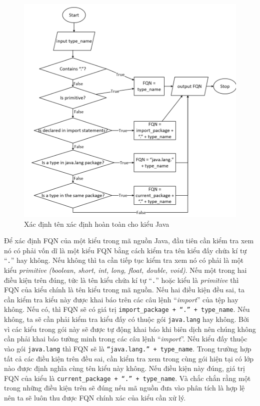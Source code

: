 \documentclass[12pt]{report}
\begin{document}
\begin{figure}[h]
	\centering
	\includegraphics[scale=0.6]{fqn-type}
	\caption{Xác định tên xác định hoàn toàn cho kiểu Java}
	\label{fig:fqn-type}
\end{figure}

Để xác định FQN của một kiểu trong mã nguồn Java, đầu tiên cần kiểm tra xem nó có phải vốn dĩ là một kiểu FQN bằng cách kiểm tra tên kiểu đấy chứa kí tự ``\texttt{.}'' hay không. Nếu không thì ta cần tiếp tục kiểm tra xem nó có phải là một kiểu \textit{primitive} \textit{(boolean, short, int, long, float, double, void)}. Nếu một trong hai điều kiện trên đúng, tức là tên kiểu chứa kí tự ``\texttt{.}'' hoặc kiểu là \textit{primitive} thì FQN của kiểu chính là tên kiểu trong mã nguồn. Nếu hai điều kiện đều sai, ta cần kiểm tra kiểu này được khai báo trên các câu lệnh ``\textit{import}'' của tệp hay không. Nếu có, thì FQN sẽ có giá trị \texttt{import\_package + ``.'' + type\_name}. Nếu không, ta sẽ cần phải kiểm tra kiểu đấy có thuộc gói \texttt{java.lang} hay không. Bởi vì các kiểu trong gói này sẽ được tự động khai báo khi biên dịch nên chúng không cần phải khai báo tường minh trong các câu lệnh ``\textit{import}''. Nếu kiểu đấy thuộc vào gói \texttt{java.lang} thì FQN sẽ là \texttt{``java.lang.'' + type\_name}. Trong trường hợp tất cả các điều kiện trên đều sai, cần kiểm tra xem trong cùng gói hiện tại có lớp nào được định nghĩa cùng tên kiểu này không. Nếu điều kiện này đúng, giá trị FQN của kiểu là \texttt{current\_package + ``.'' + type\_name}. Và chắc chắn rằng một trong những điều kiện trên sẽ đúng nếu mã nguồn đưa vào phân tích là hợp lệ nên ta sẽ luôn thu được FQN chính xác của kiểu cần xử lý.
\end{document}
